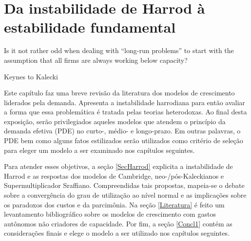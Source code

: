 \chapter{Da instabilidade de Harrod à estabilidade fundamental}

\epigraph{Is it not rather odd when dealing with ``long-run problems'' to start with the assumption that all firms are always working below capacity?}{Keynes to Kalecki}


Este capítulo faz uma breve revisão da literatura dos modelos de crescimento liderados pela demanda. Apresenta a instabilidade harrodiana para então avaliar a forma que essa problemática é tratada pelas teorias heterodoxas.
Ao final desta exposição, serão privilegiados aqueles modelos que atendem o princípio da demanda efetiva (PDE) no curto-, médio- e longo-prazo. Em outras palavras, o PDE bem como alguns fatos estilizados serão utilizados como critério de seleção para eleger um modelo a ser examinado nos capítulos seguintes.


Para atender esses objetivos, a seção \ref{SecHarrod} explicita a instabilidade de Harrod e as respostas dos modelos de Cambridge, neo-/pós-Kaleckianos e Supermultiplicador Sraffiano. Compreendidas tais propostas, mapeia-se o debate sobre a convergência do grau de utilização ao nível normal e as implicações sobre os paradoxos dos custos e da parcimônia. Na seção \ref{Literatura} é feito um levantamento bibliográfico sobre os modelos de crescimento com gastos autônomos não criadores de capacidade. Por fim, a seção \ref{Concl1} contém as considerações finais e elege o modelo a ser utilizado nos capítulos seguintes.








%


